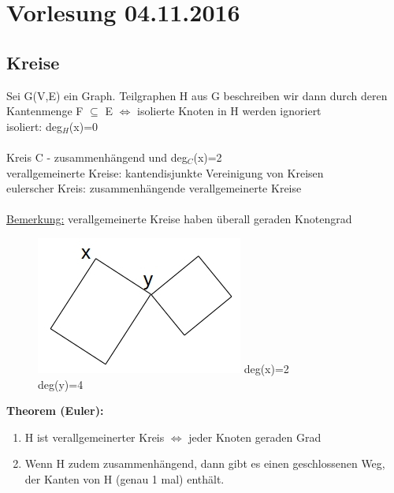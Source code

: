 \section{Vorlesung 04.11.2016}
\subsection{Kreise}
Sei G(V,E) ein Graph. Teilgraphen H aus G beschreiben wir dann durch deren Kantenmenge F $\subseteq$ E $\Leftrightarrow$ isolierte Knoten in H werden ignoriert\\
isoliert: deg$_H$(x)=0
\\\\
Kreis C - zusammenhängend und deg$_C$(x)=2\\
verallgemeinerte Kreise: kantendisjunkte Vereinigung von Kreisen\\
eulerscher Kreis: zusammenhängende verallgemeinerte Kreise\\
\\
\underline{Bemerkung:} verallgemeinerte Kreise haben überall geraden Knotengrad
\begin{figure}[htp]
\centering
\includegraphics[scale=0.75]{lectures/161104/pix/pic1.jpg}
deg(x)=2\\
deg(y)=4
\end{figure}

\textbf{Theorem (Euler):}
\begin{enumerate}
	\item H ist verallgemeinerter Kreis $\Leftrightarrow$ jeder Knoten geraden Grad
	\item Wenn H zudem zusammenhängend, dann gibt es einen geschlossenen Weg, der Kanten von H (genau 1 mal) enthält.
\end{enumerate}

